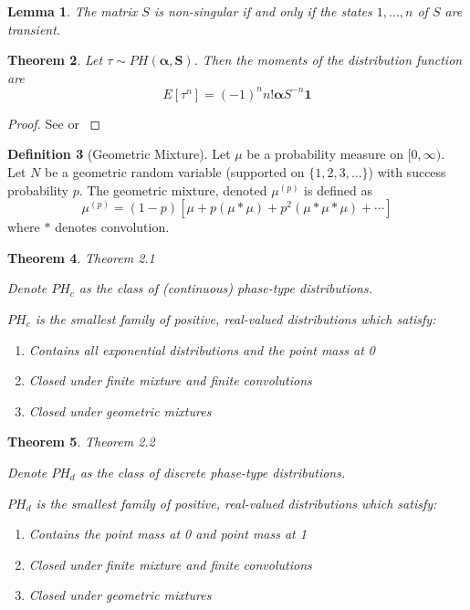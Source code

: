 \documentclass{article}
\theoremstyle{plain}
\newtheorem{theorem}{Theorem}[section]
\newtheorem{lemma}[theorem]{Lemma}
\theoremstyle{definition}
\newtheorem{defn}[theorem]{Definition}
\theoremstyle{remark}
\numberwithin{equation}{section}
\begin{document}
\begin{lemma}\cite{neuts1981}
The matrix $S$ is non-singular if and only if the states $1,\ldots, n$ of $S$ are transient.
\end{lemma}

\begin{theorem}
Let $\tau \sim PH(\boldsymbol{\alpha}, \mathbf{S})$.
Then the moments of the distribution function are
$$
E[\tau^{{n}}]=(-1)^{{n}}n!{\boldsymbol  {\alpha }}{S}^{{-n}}{\mathbf  {1}}
$$
\end{theorem}

\begin{proof}
See \cite{neuts1981} or \cite{mle_phase_type2011}
\end{proof}

\begin{defn}[Geometric Mixture] \cite{maier1992}
Let $\mu$ be a probability measure on $[0, \infty)$.
Let $N$ be a geometric random variable (supported on $\{1,2,3,\ldots\}$) with success probability $p$.
The geometric mixture, denoted $\mu^{(p)}$ is defined as
$$
\mu^{(p)} = (1 - p) [\mu + p (\mu * \mu) + p^2 (\mu * \mu * \mu) + \cdots]
$$
where $*$ denotes convolution.
\end{defn}

\begin{theorem}\cite{maier1992} Theorem 2.1

Denote $PH_c$ as the class of (continuous) phase-type distributions.

$PH_c$ is the smallest family of positive, real-valued distributions which satisfy:
\begin{enumerate}
    \item Contains all exponential distributions and the point mass at 0
    \item Closed under finite mixture and finite convolutions
    \item Closed under geometric mixtures
\end{enumerate}
\end{theorem}

\begin{theorem}\cite{maier1992} Theorem 2.2

Denote $PH_d$ as the class of discrete phase-type distributions.

$PH_d$ is the smallest family of positive, real-valued distributions which satisfy:
\begin{enumerate}
    \item Contains the point mass at 0 and point mass at 1
    \item Closed under finite mixture and finite convolutions
    \item Closed under geometric mixtures
\end{enumerate}
\end{theorem}
\end{document}
